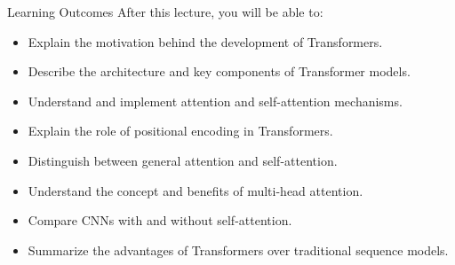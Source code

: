 \begin{frame}{Learning Outcomes}
    After this lecture, you will be able to:
    \begin{itemize}
        \item Explain the motivation behind the development of Transformers.
        \item Describe the architecture and key components of Transformer models.
        \item Understand and implement attention and self-attention mechanisms.
        \item Explain the role of positional encoding in Transformers.
        \item Distinguish between general attention and self-attention.
        \item Understand the concept and benefits of multi-head attention.
        \item Compare CNNs with and without self-attention.
        \item Summarize the advantages of Transformers over traditional sequence models.
    \end{itemize}
\end{frame}